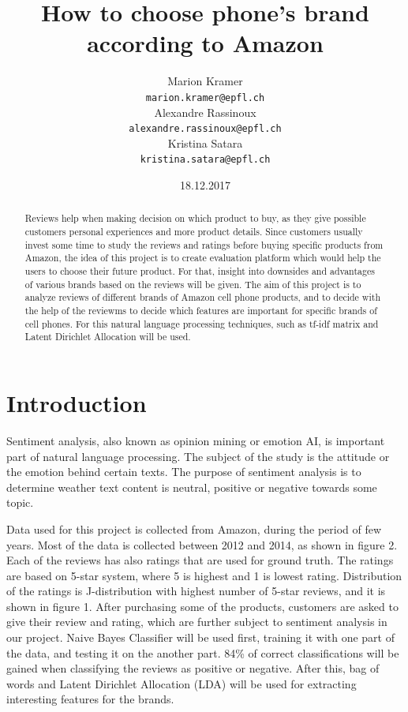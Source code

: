 \documentclass[11pt]{article}
\title{How to choose phone's brand according to Amazon}
\author{Marion Kramer\\
  {\tt marion.kramer@epfl.ch} \\\And
  Alexandre Rassinoux \\
  {\tt alexandre.rassinoux@epfl.ch} \\\And
Kristina Satara \\
{\tt kristina.satara@epfl.ch} \\}
\date{18.12.2017}
\begin{document}
\maketitle
\begin{abstract}
 Reviews help when making decision on which product to buy, as they give possible customers personal experiences and more product details. Since customers usually invest some time to study the reviews and ratings before buying specific products from Amazon, the idea of this project is to create evaluation platform which would help the users to choose their future product. For that, insight into  downsides and advantages of various brands based on the reviews will be given. The aim of this project is to analyze reviews of different brands of Amazon cell phone products, and to decide with the help of the reviewms to decide which features are important for specific brands of cell phones. For this natural language processing techniques, such as tf-idf matrix and Latent Dirichlet Allocation will be used.
\end{abstract}


\section{Introduction}
Sentiment analysis, also known as opinion mining or emotion AI, is important part of natural language processing. The subject of the study is the attitude or the emotion behind certain texts. The purpose of sentiment analysis is to determine weather text content is neutral, positive or negative towards some topic. 

Data used for this project is collected from Amazon, during the period of few years. Most of the data is collected between 2012 and 2014, as shown in figure 2. Each of the reviews has also ratings that are used for ground truth. The ratings are based on 5-star system, where 5 is highest and 1 is lowest rating. Distribution of the ratings is J-distribution with highest number of 5-star reviews, and it is shown in figure 1. After purchasing some of the products, customers are asked to give their review and rating, which are further subject to sentiment analysis in our project. Naive Bayes Classifier will be used first, training it with one part of the data, and testing it on the another part. 84\% of correct classifications will be gained when classifying the reviews as positive or negative. After this, bag of words and Latent Dirichlet Allocation (LDA) will be used for extracting interesting features for the brands. 
\end{document}
